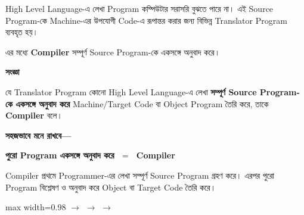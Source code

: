 
High Level Language-এ লেখা Program কম্পিউটার সরাসরি বুঝতে পারে না।
এই Source Program-কে Machine-এর উপযোগী Code-এ রূপান্তর করার জন্য
বিভিন্ন Translator Program ব্যবহৃত হয়।

এর মধ্যে \textbf{Compiler} সম্পূর্ণ Source Program-কে
একসঙ্গে অনুবাদ করে।


\begin{definitionbox}

\textbf{\color{darkTeal}সংজ্ঞা}

যে Translator Program কোনো High Level Language-এ লেখা
\textbf{সম্পূর্ণ Source Program-কে একসঙ্গে অনুবাদ করে}
Machine/Target Code বা Object Program তৈরি করে,
তাকে \textbf{Compiler} বলে।

\end{definitionbox}

\textbf{সহজভাবে মনে রাখবে—}

\begin{center}

\textbf{
পুরো Program একসঙ্গে অনুবাদ করে
\(\;=\;\)
Compiler
}

\end{center}


Compiler প্রথমে Programmer-এর লেখা সম্পূর্ণ Source Program গ্রহণ করে।
এরপর পুরো Program বিশ্লেষণ ও অনুবাদ করে Object বা Target Code
তৈরি করে।

\begin{center}
\begin{adjustbox}{max width=0.98\linewidth}
\quad
\(\longrightarrow\)
\quad
{}
\quad
\(\longrightarrow\)
\quad
{}
\quad
\(\longrightarrow\)
\quad
{}
\end{adjustbox}
\end{center}

